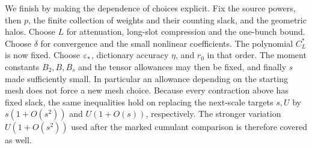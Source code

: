 We finish by making the dependence of choices explicit.  Fix the
source powers, then $p$, the finite collection of weights and their
counting slack, and the geometric halos.  Choose $L$ for attenuation,
long-slot compression and the one-bunch bound.  Choose $\delta$ for
convergence and the small nonlinear coefficients.  The polynomial
$C_L^*$ is now fixed.  Choose $\varepsilon_*$, dictionary accuracy $\eta$, and
$r_0$ in that order.  The moment constants $B_2,B,B_s$ and the tensor
allowances may then be fixed, and finally $s$ made sufficiently small.
In particular an allowance depending on the starting mesh does not
force a new mesh choice.  Because every contraction above has fixed
slack, the same inequalities hold on replacing the next-scale targets
$s,U$ by $s(1+O(s^2))$ and $U(1+O(s))$, respectively.  The stronger
variation $U(1+O(s^2))$ used after the marked cumulant comparison is
therefore covered as well.
